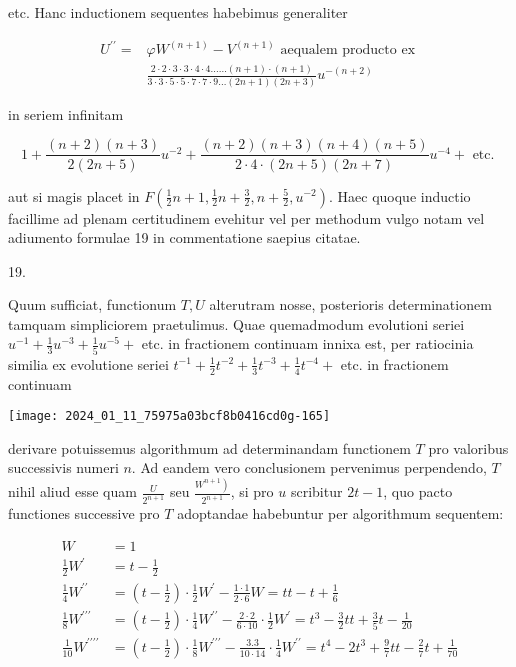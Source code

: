 \documentclass[10pt]{article}
\begin{document}
etc. Hanc inductionem sequentes habebimus generaliter

\[
\begin{aligned}
U^{\prime \prime}= & \varphi W^{(n+1)}-V^{(n+1)} \text { aequalem producto ex } \\
& \frac{2 \cdot 2 \cdot 3 \cdot 3 \cdot 4 \cdot 4 \ldots \ldots(n+1) \cdot(n+1)}{3 \cdot 3 \cdot 5 \cdot 5 \cdot 7 \cdot 7 \cdot 9 \ldots(2 n+1)(2 n+3)} u^{-(n+2)}
\end{aligned}
\]

in seriem infinitam

\[
1+\frac{(n+2)(n+3)}{2(2 n+5)} u^{-2}+\frac{(n+2)(n+3)(n+4)(n+5)}{2 \cdot 4 \cdot(2 n+5)(2 n+7)} u^{-4}+\text { etc. }
\]

aut si magis placet in \(F\left(\frac{1}{2} n+1, \frac{1}{2} n+\frac{3}{2}, n+\frac{5}{2}, u^{-2}\right)\). Haec quoque inductio facillime ad plenam certitudinem evehitur vel per methodum vulgo notam vel adiumento formulae 19 in commentatione saepius citatae.

19.

Quum sufficiat, functionum \(T, U\) alterutram nosse, posterioris determinationem tamquam simpliciorem praetulimus. Quae quemadmodum evolutioni seriei \(u^{-1}+\frac{1}{3} u^{-3}+\frac{1}{5} u^{-5}+\) etc. in fractionem continuam innixa est, per ratiocinia similia ex evolutione seriei \(t^{-1}+\frac{1}{2} t^{-2}+\frac{1}{3} t^{-3}+\frac{1}{4} t^{-4}+\) etc. in fractionem continuam

\begin{center}
\texttt{[image: 2024\_01\_11\_75975a03bcf8b0416cd0g-165]}
\end{center}

derivare potuissemus algorithmum ad determinandam functionem \(T\) pro valoribus successivis numeri \(n\). Ad eandem vero conclusionem pervenimus perpendendo, \(T\) nihil aliud esse quam \(\frac{U}{2^{n+1}}\) seu \(\frac{\left.W^{n+1}\right)}{2^{n+1}}\), si pro \(u\) scribitur \(2 t-1\), quo pacto functiones successive pro \(T\) adoptandae habebuntur per algorithmum sequentem:

\[
\begin{aligned}
W & =1 \\
\frac{1}{2} W^{\prime} & =t-\frac{1}{2} \\
\frac{1}{4} W^{\prime \prime} & =\left(t-\frac{1}{2}\right) \cdot \frac{1}{2} W^{\prime}-\frac{1 \cdot 1}{2 \cdot 6} W=t t-t+\frac{1}{6} \\
\frac{1}{8} W^{\prime \prime \prime} & =\left(t-\frac{1}{2}\right) \cdot \frac{1}{4} W^{\prime \prime}-\frac{2 \cdot 2}{6 \cdot 10} \cdot \frac{1}{2} W^{\prime}=t^{3}-\frac{3}{2} t t+\frac{3}{5} t-\frac{1}{20} \\
\frac{1}{10} W^{\prime \prime \prime \prime} & =\left(t-\frac{1}{2}\right) \cdot \frac{1}{8} W^{\prime \prime \prime}-\frac{3.3}{10 \cdot 14} \cdot \frac{1}{4} W^{\prime \prime}=t^{4}-2 t^{3}+\frac{9}{7} t t-\frac{2}{7} t+\frac{1}{70}
\end{aligned}
\]
\end{document}
